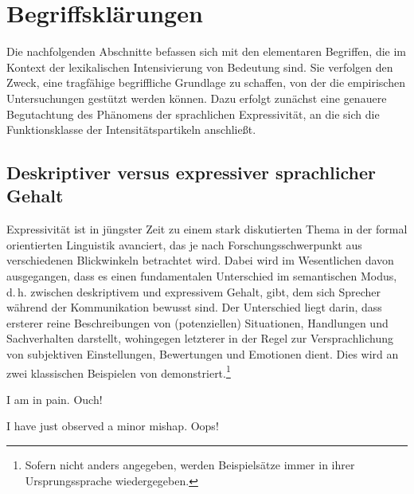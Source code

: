 \section{Begriffsklärungen}
Die nachfolgenden Abschnitte befassen sich mit den elementaren Begriffen, die im Kontext der lexikalischen Intensivierung von Bedeutung sind. Sie verfolgen den Zweck, eine tragfähige begriffliche Grundlage zu schaffen, von der die empirischen Untersuchungen gestützt werden können. Dazu erfolgt zunächst eine genauere Begutachtung des Phänomens der sprachlichen Expressivität, an die sich die Funktionsklasse der {Intensitätspartikeln anschließt}.

\subsection{Deskriptiver versus expressiver sprachlicher Gehalt} \label{DeEx}
Expressivität ist in jüngster Zeit zu einem stark diskutierten Thema in der formal orientierten Linguistik avanciert, das je nach Forschungsschwerpunkt aus verschiedenen Blickwinkeln betrachtet wird. Dabei wird im Wesentlichen davon ausgegangen, dass es einen fundamentalen Unterschied im semantischen Modus, d.\,h. zwischen deskriptivem und expressivem Gehalt, gibt, dem sich Sprecher während der Kommunikation bewusst sind. Der Unterschied liegt darin, dass ersterer reine Beschreibungen von (potenziellen) Situationen, Handlungen und Sachverhalten darstellt, wohingegen letzterer in der Regel zur Versprachlichung von subjektiven Einstellungen, Bewertungen und Emotionen dient. Dies wird an zwei klassischen Beispielen von \citet[]{Kaplan.1997} demonstriert.\footnote{Sofern nicht anders angegeben, werden Beispielsätze immer in ihrer Ursprungssprache wiedergegeben.}

 \ea  \label{kap}
 \ea I am in pain. \label{kap1}
 \ex Ouch! \label{kap2}
 \z
 \z

 \ea  \label{kap3}
 \ea I have just observed a minor mishap. \label{kap4}
 \ex Oops! \label{kap5}
 \z
 \z

